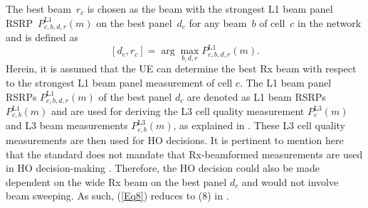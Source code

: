 \documentclass[10pt, conference]{IEEEtran}
\begin{document}
The best beam~$r_c$ is chosen as the beam with the strongest L1 beam panel RSRP~$P_{c,b,d,r}^{\mathrm{L1}}(m)$ on the best panel~$d_c$ for any beam~$b$ of cell~$c$ in the network and is defined as
%
\vspace{-0.4\baselineskip}
\begin{equation}
\label{Eq8} 
[d_c, r_c] = \arg \max_{b,d,r} P_{c,b,d,r}^{\mathrm{L1}}(m).
\end{equation}
%
Herein, it is assumed that the UE can determine the best Rx beam with respect to the strongest L1 beam panel measurement of cell $c$. The L1 beam panel RSRPs $P_{c,b,d,r}^{\mathrm{L1}}(m)$ of the best panel $d_c$ are denoted as L1 beam RSRPs $P_{c,b}^{\mathrm{L1}}(m)$ and are used for deriving the L3 cell quality measurement $P_{c}^{\mathrm{L3}}(m)$ and L3 beam measurements $P_{c,b}^{\mathrm{L3}}(m)$, as explained in .  These L3 cell quality measurements are then used for HO decisions. It is pertinent to mention here that the standard does not mandate that Rx-beamformed measurements are used in HO decision-making \cite{b8}. Therefore, the HO decision could also be made dependent on the wide Rx beam on the best panel $d_c$ and would not involve beam sweeping. As such, (\ref{Eq8}) reduces to (8) in \cite{b4}.

\end{document}
